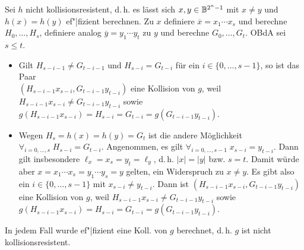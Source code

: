 \begin{Beweis}
    Sei $h$ nicht kollisionsresistent,
    d.\,h. es lässt sich $x, y \in \mathbb{B}^{2^n-1}$ mit
    $x \not= y$ und $h(x) = h(y)$ ef"|fizient berechnen.
    Zu $x$ definiere $\overline{x} = x_1 \dotsb x_s$ und berechne $H_0, \dotsc, H_s$,
    definiere analog $\overline{y} = y_1 \dotsb y_t$ zu $y$ und berechne $G_0, \dotsc, G_t$.
    OBdA sei $s \le t$.
    \begin{itemize}
        \item
        Gilt $H_{s-i-1} \not= G_{t-i-1}$ und $H_{s-i} = G_{t-i}$ für ein
        $i \in \{0, \dotsc, s-1\}$, so ist das Paar\\
        $(H_{s-i-1} x_{s-i}, G_{t-i-1} y_{t-i})$ eine Kollision von $g$, weil
        $H_{s-i-1} x_{s-i} \not= G_{t-i-1} y_{t-i}$ sowie\\
        $g(H_{s-i-1} x_{s-i}) = H_{s-i} = G_{t-i} = g(G_{t-i-1} y_{t-i})$.

        \item
        Wegen $H_s = h(x) = h(y) = G_t$
        ist die andere Möglichkeit $\forall_{i=0,\dotsc,s}\; H_{s-i} = G_{t-i}$.
        Angenommen, es gilt $\forall_{i=0,\dotsc,s-1}\; x_{s-i} = y_{t-i}$.
        Dann gilt insbesondere $\ell_x = x_s = y_t = \ell_y$, d.\,h.
        $|x| = |y|$ bzw. $s = t$.
        Damit würde aber $x = x_1 \dotsb x_s = y_1 \dotsb y_s = y$ gelten,
        ein Widerspruch zu $x \not= y$.
        Es gibt also ein $i \in \{0, \dotsc, s-1\}$ mit $x_{s-i} \not= y_{t-i}$.
        Dann ist $(H_{s-i-1} x_{s-i}, G_{t-i-1} y_{t-i})$ eine Kollision von $g$, weil
        $H_{s-i-1} x_{s-i} \not= G_{t-i-1} y_{t-i}$ sowie
        $g(H_{s-i-1} x_{s-i}) = H_{s-i} = G_{t-i} = g(G_{t-i-1} y_{t-i})$.
    \end{itemize}
    In jedem Fall wurde ef"|fizient eine Koll. von $g$ berechnet, d.\,h. $g$ ist nicht
    kollisionsresistent.
\end{Beweis}

\pagebreak
